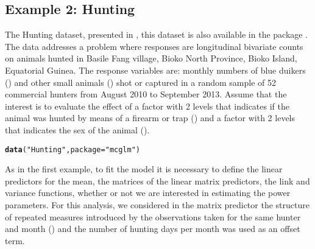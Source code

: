 \documentclass[article]{jss}\usepackage[]{graphicx}\usepackage[]{xcolor}
\makeatletter
\newcommand{\hlstr}[1]{\textcolor[rgb]{0.192,0.494,0.8}{#1}}%
\newcommand{\hlstd}[1]{\textcolor[rgb]{0.345,0.345,0.345}{#1}}%
\newcommand{\hlkwc}[1]{\textcolor[rgb]{0.333,0.667,0.333}{#1}}%
\newcommand{\hlkwd}[1]{\textcolor[rgb]{0.737,0.353,0.396}{\textbf{#1}}}%
\newenvironment{kframe}{%
 \def\at@end@of@kframe{}%
 \ifinner\ifhmode%
  \def\at@end@of@kframe{\end{minipage}}%
  \begin{minipage}{\columnwidth}%
 \fi\fi%
 \def\FrameCommand##1{\hskip\@totalleftmargin \hskip-\fboxsep
 \colorbox{shadecolor}{##1}\hskip-\fboxsep
     \hskip-\linewidth \hskip-\@totalleftmargin \hskip\columnwidth}%
 \MakeFramed {\advance\hsize-\width
   \@totalleftmargin\z@ \linewidth\hsize
   \@setminipage}}%
 {\par\unskip\endMakeFramed%
 \at@end@of@kframe}
\newenvironment{knitrout}{}{} %
\makeatother
\begin{document}
\subsection{Example 2: Hunting}

The Hunting dataset, presented in \citet{hunting}, this dataset is also available in the package . The data addresses a problem where responses are longitudinal bivariate counts on animals hunted in Basile Fang village, Bioko North Province, Bioko Island, Equatorial Guinea. The response variables are: monthly numbers of blue duikers () and other small animals () shot or captured in a random sample of 52 commercial hunters from August 2010 to September 2013. Assume that the interest is to evaluate the effect of a factor with 2 levels that indicates if the animal was hunted by means of a firearm or trap () and a factor with 2 levels that indicates the sex of the animal ().

\begin{knitrout}
\color{fgcolor}\begin{kframe}
\begin{alltt}
\hlkwd{data}\hlstd{(}\hlstr{"Hunting"}\hlstd{,} \hlkwc{package} \hlstd{=} \hlstr{"mcglm"}\hlstd{)}
\end{alltt}
\end{kframe}
\end{knitrout}

As in the first example, to fit the model it is necessary to define the linear predictors for the mean, the matrices of the linear matrix predictors, the link and variance functions, whether or not we are interested in estimating the power parameters. For this analysis, we considered in the matrix predictor the structure of repeated measures introduced by the observations taken for the same hunter and month () and the number of hunting days per month was used as an offset term.
\end{document}
